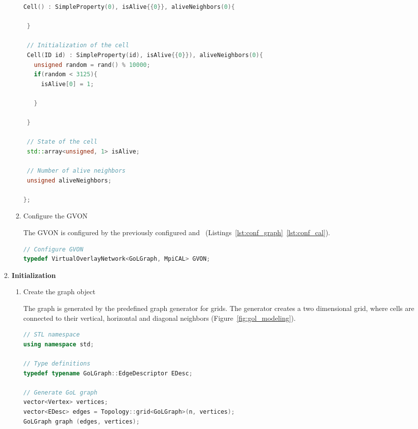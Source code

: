 \begin{enumerate}
\begin{enumerate}
\begin{minipage}[t]{\textwidth}
\begin{lstlisting}[language=C++, label=lst:gol_cell, caption={\ }]
 Cell() : SimpleProperty(0), isAlive{{0}}, aliveNeighbors(0){ 
          
 }
        
 // Initialization of the cell
 Cell(ID id) : SimpleProperty(id), isAlive{{0}}), aliveNeighbors(0){ 
   unsigned random = rand() % 10000;
   if(random < 3125){ 
     isAlive[0] = 1;
     
   }
   
 }

 // State of the cell
 std::array<unsigned, 1> isAlive;

 // Number of alive neighbors
 unsigned aliveNeighbors;
 
};
  \end{lstlisting}
  \end{minipage}

\item Configure the GVON

  The GVON is configured by the previously configured 
  and ~(Listings~\ref{lst:conf_graph}~\ref{lst:conf_cal}).

  \begin{minipage}[t]{\textwidth} 
  \begin{lstlisting}[language=C++, label=lst:conf_gvon, caption={}]
// Configure GVON
typedef VirtualOverlayNetwork<GoLGraph, MpiCAL> GVON;
  \end{lstlisting}
  \end{minipage}

\end{enumerate}

\item \textbf{Initialization}
  \begin{enumerate}
  
  \item Create the graph object

    The graph is generated by the predefined graph generator for
    grids. The generator creates a two dimensional grid, where cells
    are connected to their vertical, horizontal and diagonal neighbors
    (Figure~\ref{fig:gol_modeling}).

    \begin{minipage}[t]{\textwidth} 
  \begin{lstlisting}[language=C++, label=lst:gol_generator_graph, caption={}]
// STL namespace
using namespace std;

// Type definitions
typedef typename GoLGraph::EdgeDescriptor EDesc;

// Generate GoL graph
vector<Vertex> vertices;
vector<EDesc> edges = Topology::grid<GoLGraph>(n, vertices);
GoLGraph graph (edges, vertices); 
  \end{lstlisting}
  \end{minipage}


\end{enumerate}
\end{enumerate}
